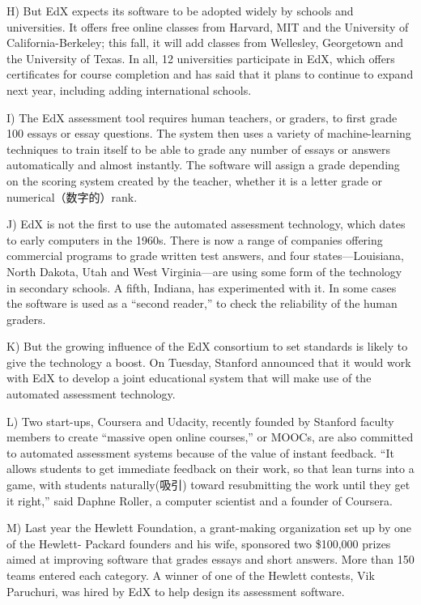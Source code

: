 \documentclass[UTF8,11pt]{ctexart}
\begin{document}
H) But EdX expects its software to be adopted widely by schools and universities. It offers free online classes from Harvard, MIT and the University of California-Berkeley; this fall, it will add classes from Wellesley, Georgetown and the University of Texas. In all, 12 universities participate in EdX, which offers certificates for course completion and has said that it plans to continue to expand next year, including adding international schools.


I) The EdX assessment tool requires human teachers, or graders, to first grade 100 essays or essay questions. The system then uses a variety of machine-learning techniques to train itself to be able to grade any number of essays or answers automatically and almost instantly. The software will assign a grade depending on the scoring system created by the teacher, whether it is a letter grade or numerical（数字的）rank.


J) EdX is not the first to use the automated assessment technology, which dates to early computers in the 1960s. There is now a range of companies offering commercial programs to grade written test answers, and four states—Louisiana, North Dakota, Utah and West Virginia—are using some form of the technology in secondary schools. A fifth, Indiana, has experimented with it. In some cases the software is used as a “second reader,” to check the reliability of the human graders.


K) But the growing influence of the EdX consortium to set standards is likely to give the technology a boost. On Tuesday, Stanford announced that it would work with EdX to develop a joint educational system that will make use of the automated assessment technology.


L) Two start-ups, Coursera and Udacity, recently founded by Stanford faculty members to create “massive open online courses,” or MOOCs, are also committed to automated assessment systems because of the value of instant feedback. “It allows students to get immediate feedback on their work, so that lean turns into a game, with students naturally(吸引) toward resubmitting the work until they get it right,” said Daphne Roller, a computer scientist and a founder of Coursera.


M) Last year the Hewlett Foundation, a grant-making organization set up by one of the Hewlett- Packard founders and his wife, sponsored two \$100,000 prizes aimed at improving software that grades essays and short answers. More than 150 teams entered each category. A winner of one of the Hewlett contests, Vik Paruchuri, was hired by EdX to help design its assessment software.
\end{document}

